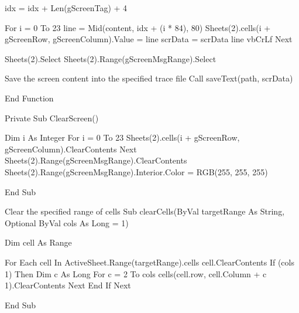 \documentclass[letterpaper,10pt,english]{sphinxmanual}
\begin{document}
\begin{sphinxVerbatim}[commandchars=\\\{\}]
   idx = idx + Len(g\PYGZus{}ScreenTag) + 4

   For i = 0 To 23
      line = Mid(content, idx + (i * 84), 80)
      Sheets(2).cells(i + g\PYGZus{}ScreenRow, g\PYGZus{}ScreenColumn).Value = line
      scrData = scrData \PYGZam{} line \PYGZam{} vbCrLf
   Next

   Sheets(2).Select
   Sheets(2).Range(g\PYGZus{}ScreenMsgRange).Select

   \PYGZsq{} Save the screen content into the specified trace file
   Call saveText(path, scrData)

End Function


Private Sub ClearScreen()

   Dim i As Integer
   For i = 0 To 23
      Sheets(2).cells(i + g\PYGZus{}ScreenRow, g\PYGZus{}ScreenColumn).ClearContents
   Next
   Sheets(2).Range(g\PYGZus{}ScreenMsgRange).ClearContents
   Sheets(2).Range(g\PYGZus{}ScreenMsgRange).Interior.Color = RGB(255, 255, 255)

End Sub


\PYGZsq{} Clear the specified range of cells
\PYGZsq{}
Sub clearCells(ByVal targetRange As String, Optional ByVal cols As Long = 1)

   Dim cell As Range

   For Each cell In ActiveSheet.Range(targetRange).cells
      cell.ClearContents
      If (cols \PYGZgt{} 1) Then
            Dim c As Long
            For c = 2 To cols
               cells(cell.row, cell.Column + c \PYGZhy{} 1).ClearContents
            Next
      End If
   Next

End Sub
\end{sphinxVerbatim}



\renewcommand{\indexname}{Index}
\printindex
\end{document}
